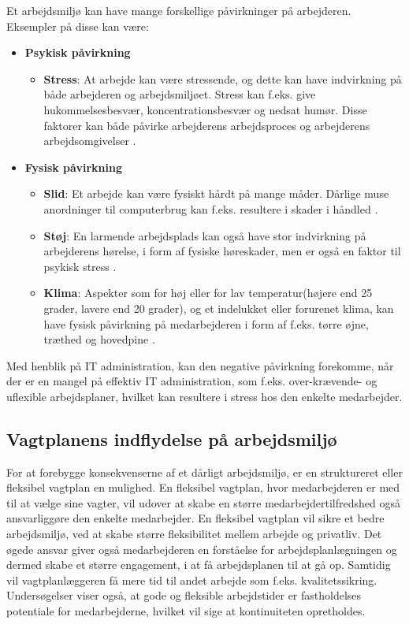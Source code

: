 Et arbejdsmiljø kan have mange forskellige påvirkninger på arbejderen. Eksempler på disse kan være: 
\begin{itemize}
    \item {\textbf{Psykisk påvirkning} \citep{Arbejdsmiljoe_psykisk}}
    \begin{itemize}
    \item {\textbf{Stress}: At arbejde kan være stressende, og dette kan have indvirkning på både arbejderen og arbejdsmiljøet. Stress kan f.eks. give hukommelsesbesvær, koncentrationsbesvær og nedsat humør. Disse faktorer kan både påvirke arbejderens arbejdsproces og arbejderens arbejdsomgivelser \citep{Arbejdsmiljoe_stress}.}
    \end{itemize}
    \item {\textbf{Fysisk påvirkning} \citep{Arbejdsmiljoe_fysisk}}
    \begin{itemize}
    \item {\textbf{Slid}: Et arbejde kan være fysiskt hårdt på mange måder. Dårlige muse anordninger til computerbrug kan f.eks. resultere i skader i håndled \citep{Arbejdsmiljoe_fysisk}.}
    \item {\textbf{Støj}: En larmende arbejdsplads kan også have stor indvirkning på arbejderens hørelse, i form af fysiske høreskader, men er også en faktor til psykisk stress \citep{Arbejdsmiljoe_stoej}.}
    \item {\textbf{Klima}: Aspekter som for høj eller for lav temperatur(højere end 25 grader, lavere end 20 grader), og et indelukket eller forurenet klima, kan have fysisk påvirkning på medarbejderen i form af f.eks. tørre øjne, træthed og hovedpine \citep{Arbejdsmiljoe_indeklima}.}\\
    \end{itemize}
\end{itemize}

Med henblik på IT administration, kan den negative påvirkning forekomme, når der er en mangel på effektiv IT administration, som f.eks. over-krævende- og uflexible arbejdsplaner, hvilket kan resultere i stress hos den enkelte medarbejder\citep{Cambridge2011}.

\subsection{Vagtplanens indflydelse på arbejdsmiljø}
For at forebygge konsekvenserne af et dårligt arbejdsmiljø, er en struktureret eller fleksibel vagtplan en mulighed. En fleksibel vagtplan, hvor medarbejderen er med til at vælge sine vagter, vil udover at skabe en større medarbejdertilfredshed også ansvarliggøre den enkelte medarbejder. En fleksibel vagtplan vil sikre et bedre arbejdsmiljø, ved at skabe større fleksibilitet mellem arbejde og privatliv. Det øgede ansvar giver også medarbejderen en forståelse for arbejdsplanlægningen og dermed skabe et større engagement, i at få arbejdsplanen til at gå op. Samtidig vil vagtplanlæggeren få mere tid til andet arbejde som f.eks. kvalitetssikring.
Undersøgelser viser også, at gode og fleksible arbejdstider er fastholdelses potentiale for medarbejderne, hvilket vil sige at kontinuiteten opretholdes. \\
    
